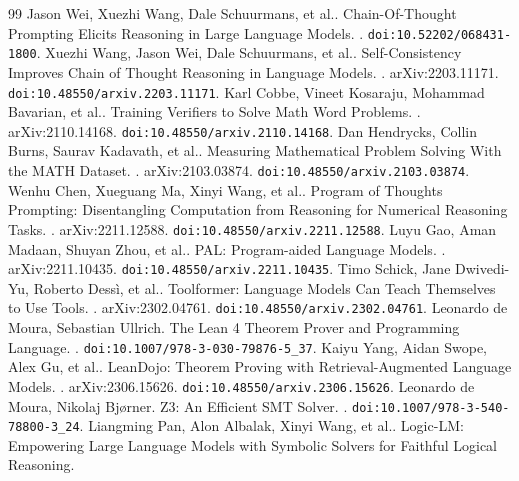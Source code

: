 \begin{thebibliography}{99}
Jason Wei, Xuezhi Wang, Dale Schuurmans, et al..
\newblock Chain-Of-Thought Prompting Elicits Reasoning in Large Language Models.
. \texttt{doi:10.52202/068431-1800}.
Xuezhi Wang, Jason Wei, Dale Schuurmans, et al..
\newblock Self-Consistency Improves Chain of Thought Reasoning in Language Models.
. arXiv:2203.11171. \texttt{doi:10.48550/arxiv.2203.11171}.
Karl Cobbe, Vineet Kosaraju, Mohammad Bavarian, et al..
\newblock Training Verifiers to Solve Math Word Problems.
. arXiv:2110.14168. \texttt{doi:10.48550/arxiv.2110.14168}.
Dan Hendrycks, Collin Burns, Saurav Kadavath, et al..
\newblock Measuring Mathematical Problem Solving With the MATH Dataset.
. arXiv:2103.03874. \texttt{doi:10.48550/arxiv.2103.03874}.
Wenhu Chen, Xueguang Ma, Xinyi Wang, et al..
\newblock Program of Thoughts Prompting: Disentangling Computation from Reasoning for Numerical Reasoning Tasks.
. arXiv:2211.12588. \texttt{doi:10.48550/arxiv.2211.12588}.
Luyu Gao, Aman Madaan, Shuyan Zhou, et al..
\newblock PAL: Program-aided Language Models.
. arXiv:2211.10435. \texttt{doi:10.48550/arxiv.2211.10435}.
Timo Schick, Jane Dwivedi-Yu, Roberto Dessì, et al..
\newblock Toolformer: Language Models Can Teach Themselves to Use Tools.
. arXiv:2302.04761. \texttt{doi:10.48550/arxiv.2302.04761}.
Leonardo de Moura, Sebastian Ullrich.
\newblock The Lean 4 Theorem Prover and Programming Language.
. \texttt{doi:10.1007/978-3-030-79876-5\_37}.
Kaiyu Yang, Aidan Swope, Alex Gu, et al..
\newblock LeanDojo: Theorem Proving with Retrieval-Augmented Language Models.
. arXiv:2306.15626. \texttt{doi:10.48550/arxiv.2306.15626}.
Leonardo de Moura, Nikolaj Bjørner.
\newblock Z3: An Efficient SMT Solver.
. \texttt{doi:10.1007/978-3-540-78800-3\_24}.
Liangming Pan, Alon Albalak, Xinyi Wang, et al..
\newblock Logic-LM: Empowering Large Language Models with Symbolic Solvers for Faithful Logical Reasoning.

\end{thebibliography}
